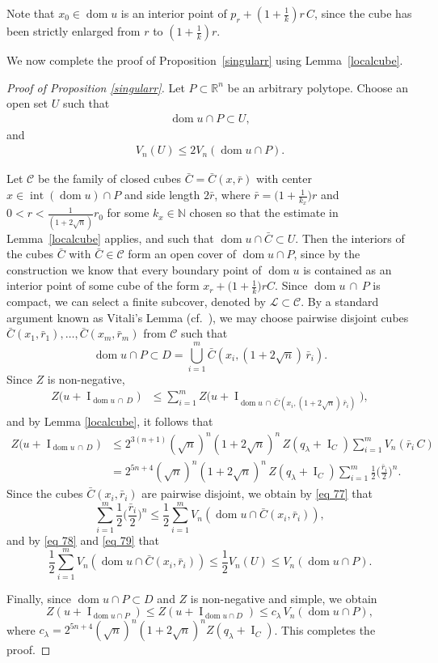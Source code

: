 \documentclass[11pt]{article}
\theoremstyle{definition} %
\DeclareMathOperator{\I}{I}
\DeclareMathOperator{\dom}{dom}
\DeclareMathOperator{\interior}{int}
\begin{document}
Note that $x_0\in \dom u$ is an interior point of $p_r+(1+\frac{1}{k})r\, C$, since the cube has been strictly enlarged from $r$ to $(1+\frac{1}{k})r$.


We now complete the proof of Proposition~\ref{singularr} using Lemma~\ref{localcube}.

\begin{proof}[Proof of Proposition \ref{singularr}]
Let $P\subset\mathbb{R}^n$ be an arbitrary polytope. Choose an open set $U$ such that
\begin{align}\label{eq 78}
\dom u\cap P  \subset U,    
\end{align}
and
\begin{align}\label{eq 79}
V_n(U)\leq 2V_n(\dom u\cap P).    
\end{align}




Let $\mathcal{C}$ be the family of closed cubes $\bar{C}=\bar{C}(x,\bar{r})$ with center $x\in \interior(\dom u) \cap P$ and side length $2\bar{r}$, where
$\bar{r}=\Big(1+\tfrac{1}{k_x}\Big)r$ and $0<r< \frac{1}{(1+2\sqrt{n})}r_0$ for some $k_x\in\mathbb{N}$  chosen so that the estimate in Lemma~\ref{localcube} applies,  and such that $\dom u\cap  \bar{C} \subset U$. Then the  interiors of the cubes  $\bar{C}$ with $\bar{C}\in \mathcal{C}$ form an open cover of $\dom u \cap P$, since by the construction we know that  every boundary point of 
$\dom u$ is contained as an interior point of some cube of the form $x_r+\bigl(1+\tfrac{1}{k}\bigr)rC$. Since $\dom u\, \cap \,P$ is compact, we can select a finite subcover,  denoted by $\mathcal{L}\subset \mathcal{C}$.  
By  a standard argument known as Vitali's Lemma (cf.\ \cite[Lemma 1.9]{falconer1985geometry}),  we may choose pairwise disjoint cubes $\bar{C}(x_1, \bar{r}_1), \dots, \bar{C}(x_m, \bar{r}_m)$ from $\mathcal{C}$  such that
$$\dom u \cap P \subset D=\bigcup_{i=1}^m \bar{C}\left(x_i, (1+2\sqrt{n})\, \bar{r}_i\right).$$
Since $Z$ is non-negative,
\begin{align}
 Z\bigl(u+\I_{  \dom u\, \cap \, D}\bigr)& \le \sum_{i=1}^m Z\bigl(u+ \I_{ \dom u\, \cap \, \bar{C}(x_i, (1+2\sqrt{n})\,\bar{r}_i)}\bigr),
\end{align}
and by Lemma \ref{localcube}, it follows that 
\begin{align}
\nonumber Z\bigl(u+\I_{  \dom u\, \cap \, D}\bigr) & \leq  2^{3(n+1)}(\sqrt{n})^n(1+2\sqrt{n})^n\,Z(q_\lambda+ \I_C)\sum_{i=1}^mV_n(\bar{r}_i\, C)\\
\nonumber & =   2^{5n+4}(\sqrt{n})^n(1+2\sqrt{n})^n\,Z(q_\lambda+ \I_C) \sum_{i=1}^m \frac{1}{2}\Big(\frac{{\bar{r}_i}}{2}\Big)^n.
\end{align}
Since the cubes $\bar{C}(x_i,\bar{r}_i)$ are pairwise disjoint, we obtain by \eqref{eq 77} that
$$\sum_{i=1}^m \frac{1}{2}\Big(\frac{{\bar{r}_i}}{2}\Big)^n\leq \frac{1}{2}\sum_{i=1}^m V_n(\dom u\cap \bar{C}(x_i,\bar{r}_i)),$$
and by \eqref{eq 78} and  \eqref{eq 79} that
$$\frac{1}{2}\sum_{i=1}^m V_n(\dom u\cap \bar{C}(x_i,\bar{r}_i))\leq \frac{1}{2}V_n(U)\le 
V_n(\dom u\cap P).$$

Finally, since $\dom u\cap P\subset D$ and $Z$ is non-negative and simple, we obtain
\[
Z(u+\I_{\dom u\cap P})
\leq
Z(u+\I_{\dom u\cap D})
\leq
c_{\lambda}\,V_n(\dom u\cap P),
\]
where
\(
c_{\lambda}
=
2^{5n+4}(\sqrt n)^n(1+2\sqrt n)^n Z(q_\lambda+\I_C)\).
This completes the proof.
\end{proof}
\end{document}
